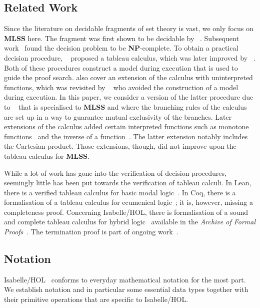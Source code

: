 \documentclass[
  sigplan,
  10pt,
  ]{acmart}
\newcommand{\MLSS}{\textbf{MLSS}}
\begin{document}
\subsection{Related Work}
Since the literature on decidable fragments of set theory is vast, we only focus on \MLSS{} here.
The fragment was first shown to be decidable by \citeauthor{mlss_first}~\cite{mlss_first}.
Subsequent work~\cite{mlss_np} found the decision problem to be \textbf{NP}-complete.
To obtain a practical decision procedure, \citeauthor{mlss_first_tableau}~\cite{mlss_first_tableau} proposed a tableau calculus, which was later improved by \citeauthor{tableau_quantifier_free}~\cite{tableau_quantifier_free}.
Both of these procedures construct a model during execution that is used to guide the proof search.
\citeauthor{tableau_quantifier_free} also cover an extension of the calculus with uninterpreted functions, which was revisited by \citeauthor{mlss_quantification}~\cite{mlss_quantification} who avoided the construction of a model during execution.
In this paper, we consider a version of the latter procedure due to \citeauthor{new_fast_tableau}~\cite{new_fast_tableau} that is specialised to \MLSS{} and where the branching rules of the calculus are set up in a way to guarantee mutual exclusivity of the branches.
Later extensions of the calculus added certain interpreted functions such as monotone functions~\cite{mlss_monotone_functions} and the inverse of a function~\cite{mlss_cartesian_map}.
The latter extension notably includes the Cartesian product.
Those extensions, though, did not improve upon the tableau calculus for \MLSS{}.

While a lot of work has gone into the verification of decision procedures, seemingly little has been put towards the verification of tableau calculi.
In Lean, there is a verified tableau calculus for basic modal logic~\cite{modal_logic_lean}.
In Coq, there is a formalisation of a tableau calculus for ecumenical logic~\cite{ecumenical_logic}; it is, however, missing a completeness proof.
Concerning Isabelle/HOL, there is formalisation of a sound and complete tableau calculus for hybrid logic~\cite{hybrid_logic} available in the \textit{Archive of Formal Proofs}~\cite{hybrid_logic_afp}.
The termination proof is part of ongoing work~\cite{hybrid_logic_workshop}.

\subsection{Notation}
Isabelle/HOL~\cite{isabelle} conforms to everyday mathematical notation for the most part.
We establish notation and in particular some essential data types together with their primitive operations that are specific to Isabelle/HOL.
\end{document}
